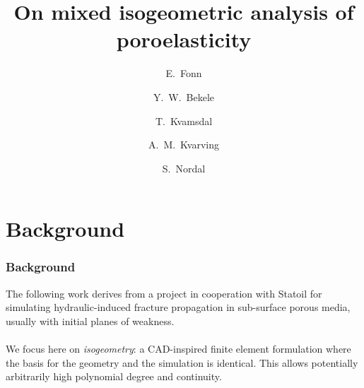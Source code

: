 \documentclass{beamer}
\begin{document}
\title[Mixed-order poroelasticity]{On mixed isogeometric analysis of poroelasticity}
\author[E. Fonn]{
  E.~Fonn \and
  Y.~W.~Bekele \and
  T.~Kvamsdal \and
  A.~M.~Kvarving \and
  S.~Nordal
}
\date[WCCM 2016]{}


\begin{frame}
  \titlepage{}
\end{frame}

\section{Background}

\begin{frame}
  \frametitle{Background}

  The following work derives from a project in cooperation with Statoil for
  simulating hydraulic-induced fracture propagation in sub-surface porous media,
  usually with initial planes of weakness. \\~\\

  We focus here on \emph{isogeometry}: a CAD-inspired finite element formulation
  where the basis for the geometry and the simulation is identical. This allows
  potentially arbitrarily high polynomial degree and continuity.
\end{frame}
\end{document}
